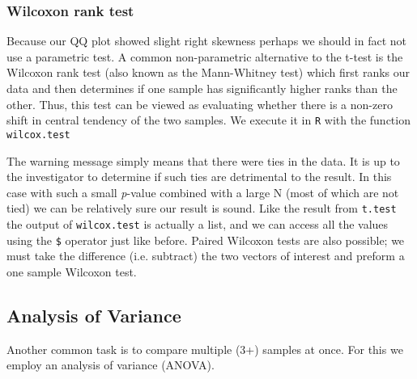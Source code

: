 \documentclass[12pt]{article}
\begin{document}
\subsubsection{Wilcoxon rank test}
Because our QQ plot showed slight right skewness perhaps we should in fact not use a parametric test.  A common non-parametric alternative to the t-test is the Wilcoxon rank test (also known as the Mann-Whitney test) which first ranks our data and then determines if one sample has significantly higher ranks than the other.  Thus, this test can be viewed as evaluating whether there is a non-zero shift in central tendency of the two samples.  We execute it in \verb+R+ with the function \verb+wilcox.test+
\begin{quote}
	
\end{quote}
The warning message simply means that there were ties in the data.  It is up to the investigator to determine if such ties are detrimental to the result.  In this case with such a small \emph{p}-value combined with a large N (most of which are not tied) we can be relatively sure our result is sound.  Like the result from \verb+t.test+ the output of \verb+wilcox.test+ is actually a list, and we can access all the values using the \verb+$+ operator just like before.  Paired Wilcoxon tests are also possible; we must take the difference (i.e. subtract) the two vectors of interest and preform a one sample Wilcoxon test.

\subsection{Analysis of Variance}	\label{sec:anova}
Another common task is to compare multiple (3+) samples at once.  For this we employ an analysis of variance (ANOVA).  
\end{document}
